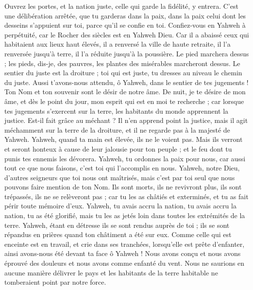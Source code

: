 \begin{multicols}{2}
Ouvrez les portes, et la nation juste, celle qui garde la fidélité, y entrera.
C'est une délibération arrêtée, que tu garderas dans la paix, dans la paix celui dont les desseins s'appuient sur toi, parce qu'il se confie en toi.
Confiez-vous en Yahweh à perpétuité, car le Rocher  des siècles est en Yahweh Dieu.
Car il a abaissé ceux qui habitaient aux lieux haut élevés, il a renversé la ville de haute retraite, il l'a renversée jusqu'à terre, il l'a réduite jusqu'à la poussière.
Le pied marchera dessus ; les pieds, dis-je, des pauvres, les plantes des misérables marcheront dessus.
Le sentier du juste est la droiture ; toi qui est juste, tu dresses au niveau le chemin du juste.
Aussi t'avons-nous attendu, ô Yahweh, dans le sentier de tes jugements ! Ton Nom et ton souvenir sont le désir de notre âme.
De nuit, je te désire de mon âme, et dès le point du jour, mon esprit qui est en moi te recherche ; car lorsque tes jugements s'exercent sur la terre, les habitants du monde apprennent la justice.
Est-il fait grâce au méchant ? Il n'en apprend point la justice, mais il agit méchamment sur la terre de la droiture, et il ne regarde pas à la majesté de Yahweh.
Yahweh, quand ta main est élevée, ils ne le voient pas. Mais ils verront et seront honteux à cause de leur jalousie pour ton peuple ; et le feu dont tu punis tes ennemis les dévorera.
Yahweh, tu ordonnes la paix pour nous, car aussi tout ce que nous faisons, c'est toi qui l'accomplis en nous.
Yahweh, notre Dieu, d'autres seigneurs que toi nous ont maîtrisés, mais c'est par toi seul que nous pouvons faire mention de ton Nom.
Ils sont morts, ils ne revivront plus, ils sont trépassés, ils ne se relèveront pas ; car tu les as châtiés et exterminés, et tu as fait périr toute mémoire d'eux.
Yahweh, tu avais accru la nation, tu avais accru la nation, tu as été glorifié, mais tu les as jetés loin dans toutes les extrémités de la terre.
Yahweh, étant en détresse ils se sont rendus auprès de toi ; ils se sont répandus en prières quand ton châtiment a été sur eux.
Comme celle qui est enceinte est en travail, et crie dans ses tranchées, lorsqu'elle est prête d'enfanter, ainsi avons-nous été devant ta face ô Yahweh !
Nous avons conçu et nous avons éprouvé des douleurs et nous avons comme enfanté du vent. Nous ne saurions en aucune manière délivrer le pays et les habitants de la terre habitable ne tomberaient point par notre force.

\end{multicols}
